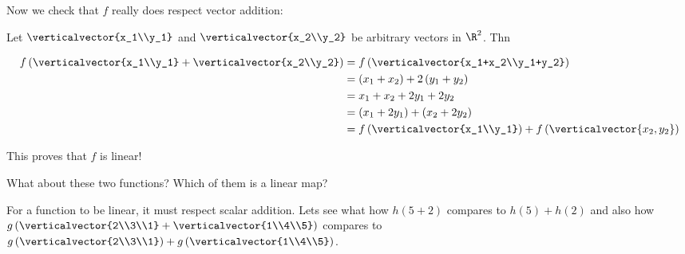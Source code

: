 \documentclass{ximera}
\begin{document}
\begin{question}
\begin{solution}
\begin{hint}
\begin{question}
        	 Now we check that $f$ really does respect vector addition:
		 
        	 Let $\verticalvector{x_1\\y_1}$ and $\verticalvector{x_2\\y_2}$ be arbitrary vectors in $\R^2$.  Thn
		 
        	 \begin{align*}
        	 f\left(\verticalvector{x_1\\y_1}+\verticalvector{x_2\\y_2}\right)&= f\left(\verticalvector{x_1+x_2\\y_1+y_2}\right)\\
        	 &= \left(x_1+x_2\right)+2\left(y_1+y_2\right)\\
        	 &= x_1+x_2+2y_1+2y_2\\
        	 &=\left(x_1+2y_1\right)+\left(x_2+2y_2\right)\\
        	 &=f\left(\verticalvector{x_1\\y_1}\right)+f\left(\verticalvector{x_2,y_2}\right)
        	 \end{align*}
		 
        	 This proves that $f$ is linear!
		
        \end{question}
	
    \end{hint}

    \begin{multiple-choice}

    \end{multiple-choice}
  \end{solution}

  What about these two functions?  Which of them is a linear map?
  \begin{solution}
 
    \begin{hint}
    	For a function to be linear, it must respect scalar addition.  Lets see what how $h(5+2)$ compares to 
    	$h(5)+h(2)$ and also how $g\left( \verticalvector{2\\3\\1}+\verticalvector{1\\4\\5}\right)$ compares to 
    	$g\left(\verticalvector{2\\3\\1}\right)+g\left( \verticalvector{1\\4\\5}\right)$.
	

\end{hint}
\end{solution}
\end{question}
\end{document}
